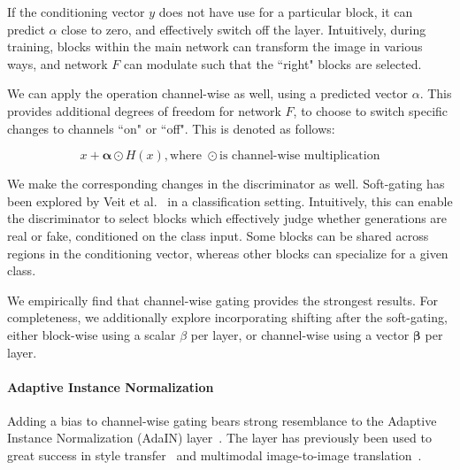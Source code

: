 If the conditioning vector $y$ does not have use for a particular block, it can predict $\alpha$ close to zero, and effectively switch off the layer. Intuitively, during training, blocks within the main network can transform the image in various ways, and network $F$ can modulate such that the ``right" blocks are selected.

We can apply the operation channel-wise as well, using a predicted vector $\alpha$. This provides additional degrees of freedom for network $F$, to choose to switch specific changes to channels ``on" or ``off". This is denoted as follows:

\begin{equation}
x + \mathbf{\alpha} \odot H(x), \text{where } \odot \text{is channel-wise multiplication}
\end{equation}

We make the corresponding changes in the discriminator as well. Soft-gating has been explored by Veit et al.~\cite{veit2018adaptive} in a classification setting. Intuitively, this can enable the discriminator to select blocks which effectively judge whether generations are real or fake, conditioned on the class input.
Some blocks can be shared across regions in the conditioning vector, whereas other blocks can specialize for a given class.

We empirically find that channel-wise gating provides the strongest results. For completeness, we additionally explore incorporating shifting after the soft-gating, either block-wise using a scalar $\beta$ per layer, or channel-wise using a vector $\mathbf{\beta}$ per layer.

\paragraph{Adaptive Instance Normalization} Adding a bias to channel-wise gating bears strong resemblance to the Adaptive Instance Normalization (AdaIN) layer~\cite{huang2017arbitrary}. The layer has previously been used to great success in style transfer~\cite{huang2017arbitrary} and multimodal image-to-image translation~\cite{XX}. 


